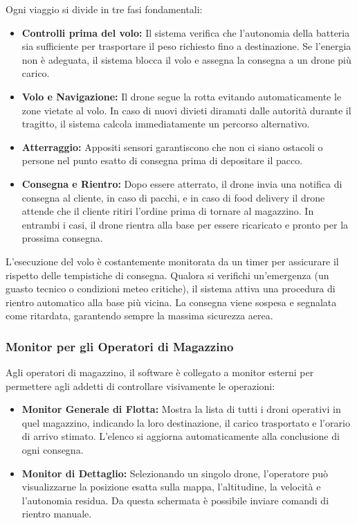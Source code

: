 \documentclass[11pt, a4paper]{article}
\begin{document}
Ogni viaggio si divide in tre fasi fondamentali:

\begin{itemize}
    \item \textbf{Controlli prima del volo:} Il sistema verifica che l'autonomia della batteria sia sufficiente per trasportare il peso richiesto fino a destinazione. Se l'energia non è adeguata, il sistema blocca il volo e assegna la consegna a un drone più carico.
    \item \textbf{Volo e Navigazione:} Il drone segue la rotta evitando automaticamente le zone vietate al volo. In caso di nuovi divieti diramati dalle autorità durante il tragitto, il sistema calcola immediatamente un percorso alternativo.
    \item \textbf{Atterraggio:} Appositi sensori garantiscono che non ci siano ostacoli o persone nel punto esatto di consegna prima di depositare il pacco.
    \item \textbf{Consegna e Rientro:} Dopo essere atterrato, il drone invia una notifica di consegna al cliente, in caso di pacchi, e in caso di food delivery il drone attende che il cliente ritiri l'ordine prima di tornare al magazzino. In entrambi i casi, il drone rientra alla base per essere ricaricato e pronto per la prossima consegna.
\end{itemize}

L'esecuzione del volo è costantemente monitorata da un timer per assicurare il rispetto delle tempistiche di consegna. Qualora si verifichi un'emergenza (un guasto tecnico o condizioni meteo critiche), il sistema attiva una procedura di rientro automatico alla base più vicina. La consegna viene sospesa e segnalata come ritardata, garantendo sempre la massima sicurezza aerea.

\subsubsection*{Monitor per gli Operatori di Magazzino}
Agli operatori di magazzino, il software è collegato a monitor esterni per permettere agli addetti di controllare visivamente le operazioni:

\begin{itemize}
    \item \textbf{Monitor Generale di Flotta:} Mostra la lista di tutti i droni operativi in quel magazzino, indicando la loro destinazione, il carico trasportato e l'orario di arrivo stimato. L'elenco si aggiorna automaticamente alla conclusione di ogni consegna.
    \item \textbf{Monitor di Dettaglio:} Selezionando un singolo drone, l'operatore può visualizzarne la posizione esatta sulla mappa, l'altitudine, la velocità e l'autonomia residua. Da questa schermata è possibile inviare comandi di rientro manuale.
\end{itemize}
\end{document}
